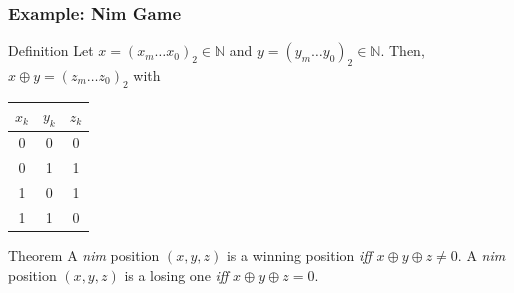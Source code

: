 \documentclass{beamer}
\begin{document}
\begin{frame}%
\frametitle{Example: Nim Game}

\begin{block}{Definition}
Let $x = (x_m \ldots x_0)_2 \in \mathbb{N}$ and $y = (y_m \ldots y_0)_2 \in \mathbb{N}$. Then, $x \oplus y = (z_m \ldots z_0)_2$
with \begin{tabular}{|c|c||c|}
\hline
$x_k$ & $y_k$ & $z_k$\\
\hline
0 & 0 & 0\\
0 & 1 & 1\\
1 & 0 & 1\\
1 & 1 & 0\\
\hline
\end{tabular}
\end{block}

\vspace{0.4cm}


\begin{block}{Theorem} A \emph{nim} position $(x,y,z)$ is a winning position \emph{iff}
$x \oplus y \oplus z \ne 0$. A \emph{nim} position $(x,y,z)$ is a losing one \emph{iff}
$x \oplus y \oplus z = 0$.
\end{block}

\end{frame}
\end{document}
